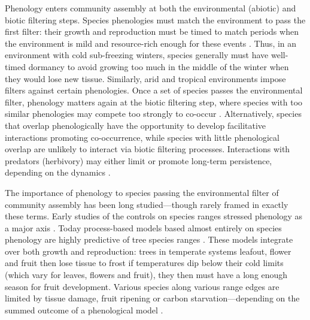 \documentclass[11pt]{article}
\begin{document}
Phenology enters community assembly at both the environmental (abiotic) and biotic filtering steps. Species phenologies must match the environment to pass the first filter: their growth and reproduction must be timed to match periods when the environment is mild and resource-rich enough for these events \citep{rathcke1985phenological}. Thus, in an environment with cold sub-freezing winters, species generally must have well-timed dormancy to avoid growing too much in the middle of the winter when they would lose new tissue. Similarly, arid and tropical environments impose filters against certain phenologies. Once a set of species passes the environmental filter, phenology matters again at the biotic filtering step, where species with too similar phenologies may compete too strongly to co-occur \citep{gause1932experimental, abrams1983theory}.   Alternatively, species that overlap phenologically have the opportunity to develop facilitative interactions \citep{duchenne2021phenological} promoting co-occurrence, while species with little phenological overlap are unlikely to interact via biotic filtering processes. Interactions with predators (herbivory) may either limit or promote long-term persistence, depending on the dynamics \citep[such dynamics relate in part to a larger literature on trophic synchrony, for which we refer readers to a number of recent reviews, e.g.][]{kharouba2018global,renner2018climate}.

The importance of phenology to species passing the environmental filter of community assembly has been long studied---though rarely framed in exactly these terms. Early studies of the controls on species ranges stressed phenology as a major axis \citep{salisbury1926geographical}. Today process-based models based almost entirely on species phenology are highly predictive of tree species ranges \citep[where they have been tested,][]{chuineJTB,Morin:2009gt,morin2007}. These models integrate over both growth and reproduction: trees in temperate systems leafout, flower and fruit then lose tissue to frost if temperatures dip below their cold limits (which vary for leaves, flowers and fruit), they then must have a long enough season for fruit development. Various species along various range edges are limited by tissue damage, fruit ripening or carbon starvation---depending on the summed outcome of a phenological model \citep{Chuine:2010gm}. 
\end{document}
